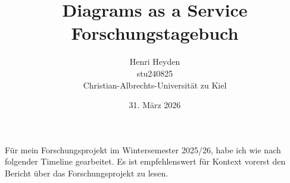 
\usepackage{longtable}
\usepackage{array}
\usepackage{booktabs} %

\usepackage{titling}
\setlength{\droptitle}{-10em}

\newenvironment{timeline}{%
    \begin{longtable}{@{} p{1.5cm} p{9cm} p{2.5cm} @{}}
    \multicolumn{3}{l}{\textbf{Timeline}} \\
    \toprule
      \textbf{Datum} & \textbf{Aktivität} & \textbf{Aufwand} \\
    \midrule
    \endfirsthead
    \multicolumn{3}{l}{\textbf{Timeline (Fortsetzung)}} \\
    \toprule
    \textbf{Datum} & \textbf{Aktivität} & \textbf{Aufwand} \\
    \midrule
    \endhead
    \midrule
    \multicolumn{3}{r}{{Weiter nächste Seite}} \\
    \endfoot
    \bottomrule
    \endlastfoot
}{%
    \end{longtable}
}


\title{Diagrams as a Service \\ \small Forschungstagebuch}
\date{31. März 2026}
\author{Henri Heyden \\%
 \small stu240825 \\%
 \small Christian-Albrechts-Universität zu Kiel%
}


    \maketitle
    
    \noindent
    Für mein Forschungsprojekt im Wintersemester 2025/26, habe ich wie nach folgender Timeline gearbeitet.
    Es ist empfehlenswert für Kontext vorerst den Bericht über das Forschungsprojekt zu lesen.


